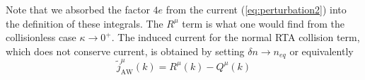 Note that we absorbed the factor $4e$ from the current (\ref{eq:perturbation2}) into the definition of these integrals. The $R^{\mu}$ term is what one would find from the collisionless case $\kappa \rightarrow 0^+$. The induced current for the normal RTA collision term, which does not conserve current, is obtained by setting $\delta n \rightarrow n_{eq}$ or equivalently
\begin{equation}\label{eq:jRTA}
\widetilde{j}_{\mathrm{AW}}^\mu(k) = R^\mu(k) - Q^\mu(k)
\end{equation}




